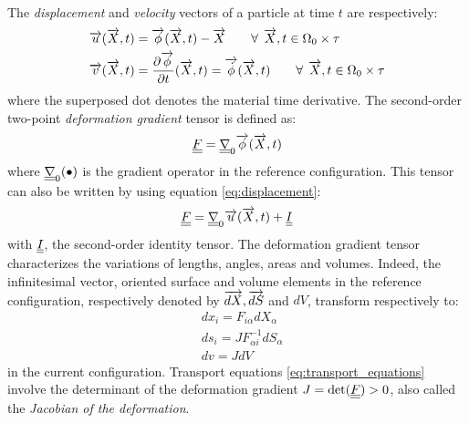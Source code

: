 The \textit{displacement} and \textit{velocity} vectors of a particle at time $t$ are respectively:
\begin{align}
    &{\overrightarrow{u}}({\overrightarrow{X}},t)={\overrightarrow{\phi}}({\overrightarrow{X}},t) - {\overrightarrow{X}} \qquad \forall\:\: {\overrightarrow{X}},t \in \Omega_0\times \tau  \label{eq:displacement}\\
    &{\overrightarrow{v}}({\overrightarrow{X}},t)=\frac{\partial {\overrightarrow{\phi}}}{\partial t}({\overrightarrow{X}},t) = {\overrightarrow{\dot{\phi}}}({\overrightarrow{X}},t) \qquad  \forall\: \: {\overrightarrow{X}},t \in \Omega_0\times \tau  \label{eq:velocity}
\end{align}
where the superposed dot denotes the material time derivative. The second-order two-point \textit{deformation gradient} tensor is defined as:
\begin{equation}
  \label{eq:F_phi}
    {\underline{\underline{F}}}={\underline{\underline{\nabla}}}_0 {\overrightarrow{\phi}} ({\overrightarrow{X}},t)
\end{equation}
where ${\underline{\underline{\nabla}}}_0 (\bullet)$ is the gradient operator in the reference configuration. This tensor can also be written by using equation \eqref{eq:displacement}:
\begin{equation}
  {\underline{\underline{F}}}= {\underline{\underline{\nabla}}}_0 {\overrightarrow{u}}({\overrightarrow{X}},t) + {\underline{\underline{I}}} \label{eq:F_displacement}
\end{equation}
with ${\underline{\underline{I}}}$, the second-order identity tensor. The deformation gradient tensor characterizes the variations of lengths, angles, areas and volumes. Indeed, the infinitesimal vector, oriented surface and volume elements in the reference configuration, respectively denoted by ${\overrightarrow{dX}},{\overrightarrow{dS}}$ and $dV$, transform respectively to:
\begin{equation}
  \label{eq:transport_equations}
  \begin{aligned}
    & dx_i=F_{i\alpha}dX_\alpha \\
    & ds_i=J F_{\alpha i}^{-1}dS_{\alpha} \\
    & dv=JdV 
  \end{aligned}
\end{equation}
in the current configuration. Transport equations \eqref{eq:transport_equations} involve the determinant of the deformation gradient $J=\det({\underline{\underline{F}}})>0$, also called the \textit{Jacobian of the deformation}.

